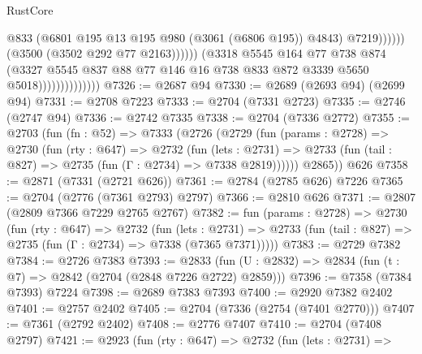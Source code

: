 \begin{lexlean}{RustCore}
\begin{coremodule}
                                                @833
                                                (@6801
                                                  @195
                                                  @13
                                                  @195
                                                  @980
                                                  (@3061 (@6806 @195))
                                                  @4843)
                                                @7219))))))
                                    (@3500 (@3502 @292 @77 @2163))))))
                            (@3318
                              @5545
                              @164
                              @77
                              @738
                              @874
                              (@3327
                                @5545
                                @837
                                @88
                                @77
                                @146
                                @16
                                @738
                                @833
                                @872
                                @3339
                                @5650
                                @5018))))))))))))))
@7326 := @2687 @94
@7330 := @2689 (@2693 @94) (@2699 @94)
@7331 := @2708 @7223
@7333 := @2704 (@7331 @2723)
@7335 := @2746 (@2747 @94)
@7336 := @2742 @7335
@7338 := @2704 (@7336 @2772)
@7355 := @2703
    (fun (fn : @52) =>
    @7333
      (@2726
        (@2729
          (fun (params : @2728) =>
          @2730
            (fun (rty : @647) =>
            @2732
              (fun (lets : @2731) =>
              @2733 (fun (tail : @827) => @2735 (fun (Γ : @2734) => @7338 @2819))))))
        @2865))
    @626
@7358 := @2871 (@7331 (@2721 @626))
@7361 := @2784 (@2785 @626) @7226
@7365 := @2704 (@2776 (@7361 @2793) @2797)
@7366 := @2810 @626
@7371 := @2807 (@2809 @7366 @7229 @2765 @2767)
@7382 := fun (params : @2728) =>
  @2730
    (fun (rty : @647) =>
    @2732
      (fun (lets : @2731) =>
      @2733 (fun (tail : @827) => @2735 (fun (Γ : @2734) => @7338 (@7365 @7371)))))
@7383 := @2729 @7382
@7384 := @2726 @7383
@7393 := @2833 (fun (U : @2832) => @2834 (fun (t : @7) => @2842 (@2704 (@2848 @7226 @2722) @2859)))
@7396 := @7358 (@7384 @7393) @7224
@7398 := @2689 @7383 @7393
@7400 := @2920 @7382 @2402
@7401 := @2757 @2402
@7405 := @2704 (@7336 (@2754 (@7401 @2770)))
@7407 := @7361 (@2792 @2402)
@7408 := @2776 @7407
@7410 := @2704 (@7408 @2797)
@7421 := @2923
    (fun (rty : @647) =>
    @2732
      (fun (lets : @2731) =>

\end{coremodule}
\end{lexlean}

